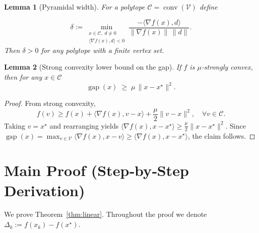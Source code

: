 \documentclass{article}
\newtheorem{lemma}{Lemma}
\newcommand{\gap}{\operatorname{gap}}
\newcommand{\conv}{\operatorname{conv}}
\newcommand{\poly}{\mathcal{C}}
\newcommand{\grad}{\nabla}
\begin{document}
\begin{lemma}[Pyramidal width]\label{lem:pyrwidth}
For a polytope $\poly=\conv(\mathcal{V})$ define  

\[
\delta:=\min_{\substack{x\in\poly,\; d\neq0\\
\langle \grad f(x),d\rangle<0}}
\frac{-\langle \grad f(x),d\rangle}
{\|\grad f(x)\|\,\|d\|}.
\]
Then $\delta>0$ for any polytope with a finite vertex set. \qedhere
\end{lemma}

\begin{lemma}[Strong convexity lower bound on the gap]\label{lem:gap_sc}
If $f$ is $\mu$‑strongly convex, then for any $x\in\poly$
\[
\gap(x) \;\ge\; \mu\,\|x-x^\star\|^{2}.
\]
\end{lemma}
\begin{proof}
From strong convexity,
\[
f(v) \ge f(x) + \langle\grad f(x),v-x\rangle + \frac{\mu}{2}\|v-x\|^{2},
\quad\forall v\in\poly .
\]
Taking $v=x^\star$ and rearranging yields
$\langle\grad f(x),x-x^\star\rangle \ge \frac{\mu}{2}\|x-x^\star\|^{2}$.
Since $\gap(x)=\max_{v\in\mathcal{V}}\langle\grad f(x),x-v\rangle\ge
\langle\grad f(x),x-x^\star\rangle$, the claim follows. \qedhere
\end{proof}

\section*{Main Proof (Step‑by‑Step Derivation)}
We prove Theorem~\ref{thm:linear}.  Throughout the proof we denote
$\Delta_k:=f(x_k)-f(x^\star)$.
\end{document}
